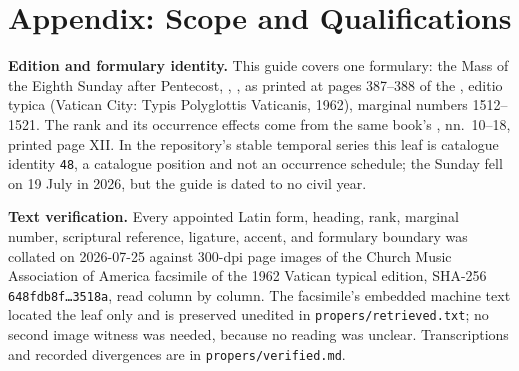\section{Appendix: Scope and Qualifications}
\vspace{-0.6em}
\begingroup
\setlength{\parskip}{0.3em}%

\textbf{Edition and formulary identity.} This guide covers one formulary: the
Mass of the Eighth Sunday after Pentecost, , , as printed at pages 387--388 of the
, editio typica (Vatican City: Typis Polyglottis
Vaticanis, 1962), marginal numbers 1512--1521. The rank and its occurrence
effects come from the same book's , nn.\ 10--18,
printed page XII. In the repository's stable temporal series this leaf is
catalogue identity \texttt{48}, a catalogue position and not an occurrence
schedule; the Sunday fell on 19 July in 2026, but the guide is dated to no civil
year.

\textbf{Text verification.} Every appointed Latin form, heading, rank, marginal
number, scriptural reference, ligature, accent, and formulary boundary was
collated on 2026-07-25 against 300-dpi page images of the Church Music
Association of America facsimile of the 1962 Vatican typical edition, SHA-256
\texttt{648fdb8f\dots3518a}, read column by column. The facsimile's embedded
machine text located the leaf only and is preserved unedited in
\texttt{propers/retrieved.txt}; no second image witness was needed, because no
reading was unclear. Transcriptions and recorded divergences are in
\texttt{propers/verified.md}.

